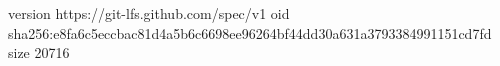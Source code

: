 version https://git-lfs.github.com/spec/v1
oid sha256:e8fa6c5eccbac81d4a5b6c6698ee96264bf44dd30a631a3793384991151cd7fd
size 20716
